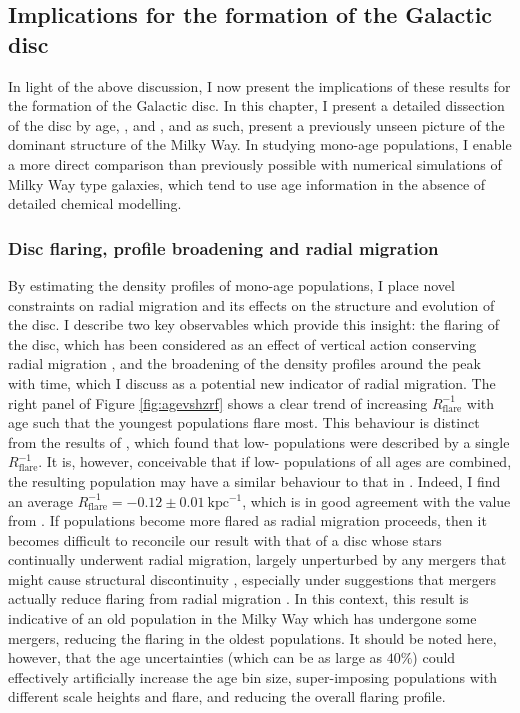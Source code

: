 \subsection{Implications for the formation of the Galactic disc}
\label{sec:implications}

In light of the above discussion, I now present the implications of these results for the formation of the Galactic disc. In this chapter, I present a detailed dissection of the disc by age, \feh{}, and \afe{}, and as such, present a previously unseen picture of the dominant structure of the Milky Way. In studying mono-age populations, I enable a more direct comparison than previously possible with numerical simulations of Milky Way type galaxies, which tend to use age information in the absence of detailed chemical modelling.

\subsubsection{Disc flaring, profile broadening and radial migration}

By estimating the density profiles of mono-age populations, I  place novel constraints on radial migration and its effects on the structure and evolution of the disc. I describe two key observables which provide this insight: the flaring of the disc, which has been considered as an effect of vertical action conserving radial migration \citep[where stars have greater vertical excursions as they migrate outward, e.g.][]{2012A&A...548A.127M}, and the broadening of the density profiles around the peak with time, which I discuss as a potential new indicator of radial migration. The right panel of Figure \ref{fig:agevshzrf} shows a clear trend of increasing $R_{\mathrm{flare}}^{-1}$ with age such that the youngest populations flare most. This behaviour is distinct from the results of \citet{2016ApJ...823...30B}, which found that low-\afe{} populations were described by a single $R_{\mathrm{flare}}^{-1}$. It is, however, conceivable that if low-\afe{} populations of all ages are combined, the resulting population may have a similar behaviour to that in \citet{2016ApJ...823...30B}. Indeed, I find an average $R_{\mathrm{flare}}^{-1} = -0.12\pm 0.01\ \mathrm{kpc^{-1}}$, which is in good agreement with the value from \citet{2016ApJ...823...30B}. If populations become more flared as radial migration proceeds, then it becomes difficult to reconcile our result with that of a disc whose stars continually underwent radial migration, largely unperturbed by any mergers that might cause structural discontinuity \citep[e.g.][]{2014MNRAS.442.2474M}, especially under suggestions that mergers actually reduce flaring from radial migration \citep[e.g.][]{2014A&A...572A..92M}. In this context, this result is indicative of an old population in the Milky Way which has undergone some mergers, reducing the flaring in the oldest populations. It should be noted here, however, that the age uncertainties (which can be as large as $40\%$) could effectively artificially increase the age bin size, super-imposing populations with different scale heights and flare, and reducing the overall flaring profile.

